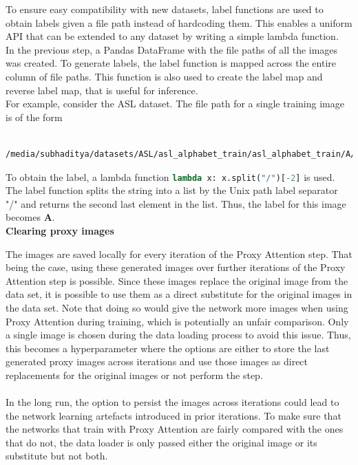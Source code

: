 \documentclass[a4paper,11pt,openright]{book}
\begin{document}
To ensure easy compatibility with new datasets, label functions are used to obtain labels given a file path instead of hardcoding them. This enables a uniform API that can be extended to any dataset by writing a simple lambda function.\\
In the previous step, a Pandas DataFrame with the file paths of all the images was created. To generate labels, the label function is mapped across the entire column of file paths. This function is also used to create the label map and reverse label map, that is useful for inference.\\
For example, consider the ASL dataset. The file path for a single training image is of the form \begin{verbatim}
    /media/subhaditya/datasets/ASL/asl_alphabet_train/asl_alphabet_train/A/A1.jpg
\end{verbatim} To obtain the label, a lambda function
\lstinline[language=Python]{lambda x: x.split("/")[-2]}
is used.
The label function splits the string into a list by the Unix path label separator "/" and returns the second last element in the list. Thus, the label for this image becomes \textbf{A}.\\


\textbf{Clearing proxy images} \label{sec:clearing_proxy_images}

The images are saved locally for every iteration of the Proxy Attention step. That being the case, using these generated images over further iterations of the Proxy Attention step is possible. Since these images replace the original image from the data set, it is possible to use them as a direct substitute for the original images in the data set.  Note that doing so would give the network more images when using Proxy Attention during training, which is potentially an unfair comparison. Only a single image is chosen during the data loading process to avoid this issue. Thus, this becomes a hyperparameter where the options are either to store the last generated proxy images across iterations and use those images as direct replacements for the original images or not perform the step.\\\\
In the long run, the option to persist the images across iterations could lead to the network learning artefacts introduced in prior iterations. To make sure that the networks that train with Proxy Attention are fairly compared with the ones that do not, the data loader is only passed either the original image or its substitute but not both.
\end{document}
